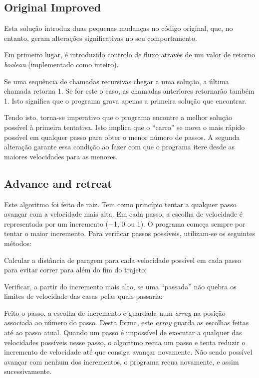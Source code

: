 \documentclass[portuguese,11pt,a4paper,titlepage]{article}
\newcommand{\extrang}[1]{\textit{#1}}
\newcommand{\srcdir}{..}
\begin{document}
\subsection{Original Improved}
Esta solução introduz duas pequenas mudanças no código original, que, no entanto,
geram alterações significativas no seu comportamento.

Em primeiro lugar, é introduzido controlo de fluxo através de um valor de retorno
\extrang{boolean} (implementado como inteiro).

Se uma sequência de chamadas recursivas chegar a uma solução, a última chamada
retorna 1. 
Se for este o caso, as chamadas anteriores retornarão também 1.
Isto significa que o programa grava apenas a primeira solução que encontrar.
\pagebreak

Tendo isto, torna-se imperativo que o programa encontre a melhor solução possível
à primeira tentativa. Isto implica que o ``carro'' se mova o mais rápido possível
em qualquer passo para obter o menor número de passos. A segunda alteração
garante essa condição ao fazer com que o programa itere
desde as maiores velocidades para as menores.


\subsection{Advance and retreat}
Este algoritmo foi feito de raiz. Tem como
princípio tentar a qualquer passo avançar com a velocidade mais alta.
Em cada passo, a escolha de velocidade é representada por um incremento
($-$1, 0 ou 1). O programa começa sempre por tentar o maior incremento.
Para verificar passos possíveis, utilizam-se os seguintes métodos:

Calcular a distância de paragem para cada velocidade possível em cada passo para evitar correr para além do fim do
trajeto:


Verificar, a partir do incremento mais alto, se uma ``passada'' não  quebra
os limites de velocidade das casas pelas quais passaria:


Feito o passo, a escolha de incremento é guardada num \extrang{array}
na posição associada ao número do passo. Desta forma, este \extrang{array}
guarda as escolhas feitas até ao passo atual.
Quando um passo é impossível de executar a qualquer das velocidades possíveis nesse
passo, o algoritmo recua um passo e tenta reduzir o incremento de velocidade até que
consiga avançar novamente. Não sendo possível avançar com nenhum dos incrementos,
o programa recua novamente, e assim sucessivamente.
\end{document}

